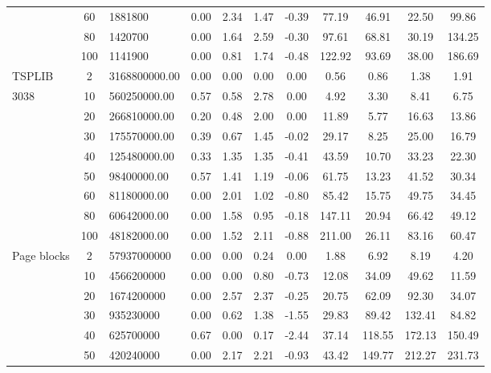{\begin{longtable}{@{}lclcccccccc@{}}
             & 60  & 1881800       & 0.00    & 2.34 & 1.47 & -0.39 & 77.19   & 46.91   & 22.50   & 99.86   \\
             & 80  & 1420700       & 0.00    & 1.64 & 2.59 & -0.30 & 97.61   & 68.81   & 30.19   & 134.25  \\
             & 100 & 1141900       & 0.00    & 0.81 & 1.74 & -0.48 & 122.92  & 93.69   & 38.00   & 186.69  \\ \hline
TSPLIB       & 2   & 3168800000.00 & 0.00    & 0.00 & 0.00 & 0.00  & 0.56    & 0.86    & 1.38    & 1.91    \\
3038         & 10  & 560250000.00  & 0.57    & 0.58 & 2.78 & 0.00  & 4.92    & 3.30    & 8.41    & 6.75    \\
             & 20  & 266810000.00  & 0.20    & 0.48 & 2.00 & 0.00  & 11.89   & 5.77    & 16.63   & 13.86   \\
             & 30  & 175570000.00  & 0.39    & 0.67 & 1.45 & -0.02 & 29.17   & 8.25    & 25.00   & 16.79   \\
             & 40  & 125480000.00  & 0.33    & 1.35 & 1.35 & -0.41 & 43.59   & 10.70   & 33.23   & 22.30   \\
             & 50  & 98400000.00   & 0.57    & 1.41 & 1.19 & -0.06 & 61.75   & 13.23   & 41.52   & 30.34   \\
             & 60  & 81180000.00   & 0.00    & 2.01 & 1.02 & -0.80 & 85.42   & 15.75   & 49.75   & 34.45   \\
             & 80  & 60642000.00   & 0.00    & 1.58 & 0.95 & -0.18 & 147.11  & 20.94   & 66.42   & 49.12   \\
             & 100 & 48182000.00   & 0.00    & 1.52 & 2.11 & -0.88 & 211.00  & 26.11   & 83.16   & 60.47   \\ \hline
Page blocks  & 2   & 57937000000   & 0.00    & 0.00 & 0.24 & 0.00  & 1.88    & 6.92    & 8.19    & 4.20    \\
             & 10  & 4566200000    & 0.00    & 0.00 & 0.80 & -0.73 & 12.08   & 34.09   & 49.62   & 11.59   \\
             & 20  & 1674200000    & 0.00    & 2.57 & 2.37 & -0.25 & 20.75   & 62.09   & 92.30   & 34.07   \\
             & 30  & 935230000     & 0.00    & 0.62 & 1.38 & -1.55 & 29.83   & 89.42   & 132.41  & 84.82   \\
             & 40  & 625700000     & 0.67    & 0.00 & 0.17 & -2.44 & 37.14   & 118.55  & 172.13  & 150.49  \\
             & 50  & 420240000     & 0.00    & 2.17 & 2.21 & -0.93 & 43.42   & 149.77  & 212.27  & 231.73  \\

\end{longtable}}
